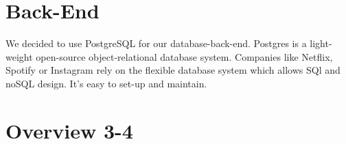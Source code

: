\section{Back-End}
We decided to use PostgreSQL for our database-back-end. Postgres is a light-weight open-source object-relational database system. 
Companies like Netflix, Spotify or Instagram \parencite{postgresUsers} rely on the flexible database system which allows SQl and noSQL design.
It's easy to set-up and maintain. 


\section{Overview 3-4}


